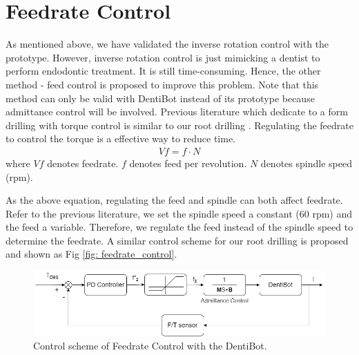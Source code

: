 \section{Feedrate Control}
\label{sec:Feed Control}
\hspace*{6mm}As mentioned above, we have validated the inverse rotation control with the prototype. However, inverse rotation control is just mimicking a dentist to perform endodontic treatment. It is still time-consuming. Hence, the other method - feed control is proposed to improve this problem. Note that this method can only be valid with DentiBot instead of its prototype because admittance control will be involved. Previous literature which dedicate to a form drilling with torque control is similar to our root drilling \cite{boessler2009effect}. Regulating the feedrate to control the torque is a effective way to reduce time. 
\begin{equation*}
\begin{split}
V\!f = f \cdot N
\end{split}
\end{equation*}
where $V\!f$ denotes feedrate. $f$ denotes feed per revolution. $N$ denotes spindle speed (rpm).
\par
As the above equation, regulating the feed and spindle can both affect feedrate. Refer to the previous literature, we set the spindle speed a constant ($60$ rpm) and the feed a variable. Therefore, we regulate the feed instead of the spindle speed to determine the feedrate. A similar control scheme for our root drilling is proposed and shown as Fig \ref{fig: feedrate_control}.
\begin{figure}[htbp]
\begin{center}
\includegraphics[width=1\linewidth]{Images/feedrate_control.png}
\caption{Control scheme of Feedrate Control with the DentiBot.}
\label{fig: feedarte_control}
\end{center}
\end{figure}
\par
